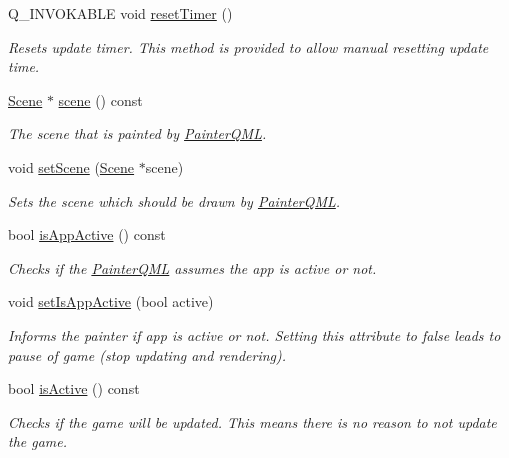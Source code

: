 \begin{DoxyCompactItemize}
Q\+\_\+\+I\+N\+V\+O\+K\+A\+B\+L\+E void \hyperlink{class_painter_q_m_l_a401a8a8b2406679b61fe326a37e97b6a}{reset\+Timer} ()
\begin{DoxyCompactList}\small\item\em Resets update timer. This method is provided to allow manual resetting update time. \end{DoxyCompactList}\item 
\hyperlink{class_scene}{Scene} $\ast$ \hyperlink{class_painter_q_m_l_a6694ad2cfda4aefaffc0a3151a2b09dd}{scene} () const 
\begin{DoxyCompactList}\small\item\em The scene that is painted by \hyperlink{class_painter_q_m_l}{Painter\+Q\+M\+L}. \end{DoxyCompactList}\item 
void \hyperlink{class_painter_q_m_l_a81288bcb25e5b985eea33b26ede7931a}{set\+Scene} (\hyperlink{class_scene}{Scene} $\ast$scene)
\begin{DoxyCompactList}\small\item\em Sets the scene which should be drawn by \hyperlink{class_painter_q_m_l}{Painter\+Q\+M\+L}. \end{DoxyCompactList}\item 
bool \hyperlink{class_painter_q_m_l_aea7b18053c645bf7c1eda6dd00715888}{is\+App\+Active} () const 
\begin{DoxyCompactList}\small\item\em Checks if the \hyperlink{class_painter_q_m_l}{Painter\+Q\+M\+L} assumes the app is active or not. \end{DoxyCompactList}\item 
void \hyperlink{class_painter_q_m_l_a71be24e10048b456a566d2a3c9a8992b}{set\+Is\+App\+Active} (bool active)
\begin{DoxyCompactList}\small\item\em Informs the painter if app is active or not. Setting this attribute to false leads to pause of game (stop updating and rendering). \end{DoxyCompactList}\item 
bool \hyperlink{class_painter_q_m_l_a391bd3c26f57dfcb3177318595c89353}{is\+Active} () const 
\begin{DoxyCompactList}\small\item\em Checks if the game will be updated. This means there is no reason to not update the game. \end{DoxyCompactList}\end{DoxyCompactItemize}

